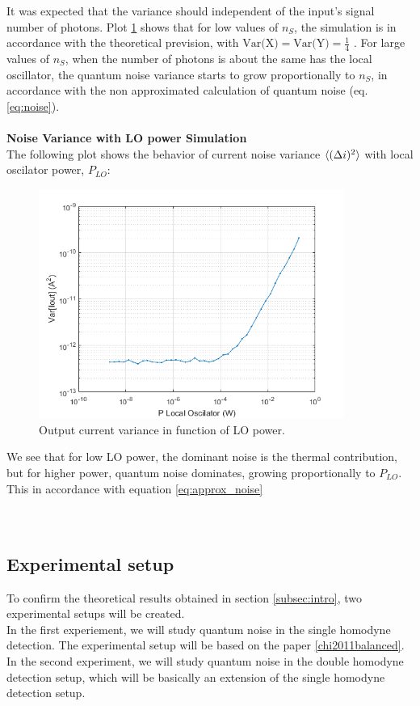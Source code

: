 \begin{bibunit}[plain]
\begin{figure}[H]
\label{fig:variance}
\end{figure}
%
It was expected that the variance should independent of the input's signal number of photons. Plot \ref{fig:variance} shows that for low values of $n_S$, the simulation is in accordance with the theoretical prevision, with $\textrm{Var(X)} = \textrm{Var(Y)} = \frac{1}{4}$ . For large values of $n_S$, when the number of photons is about the same has the local oscillator, the quantum noise variance starts to grow proportionally to $n_S$, in accordance with the non approximated calculation of quantum noise (eq. \ref{eq:noise}).\\
\\
{\bf Noise Variance with LO power Simulation}\\
The following plot shows the behavior of current noise variance $\braket{(\Delta i)^2}$ with local oscilator power, $P_{LO}$:
%
%
\begin{figure}[H]
	\centering
	\includegraphics[width=10cm]{./sdf/optical_detection/figures/power_plot.png}
	\caption{Output current variance in function of LO power.}
	\label{fig:variance_lo_power}
\end{figure}
%
%
We see that for low LO power, the dominant noise is the thermal contribution, but for higher power, quantum noise dominates, growing proportionally to $P_{LO}$. This in accordance with equation \ref{eq:approx_noise}\\
\\
\\
%
%
%
%
\subsection{Experimental setup}
%
To confirm the theoretical results obtained in section \ref{subsec:intro}, two experimental setups will be created.\\
In the first experiement, we will study quantum noise in the single homodyne detection. The experimental setup will be based on the paper \ref{chi2011balanced}.\\
In the second experiment, we will study quantum noise in the double homodyne detection setup, which will be basically an extension of the single homodyne detection setup.\\
\\

\end{bibunit}
